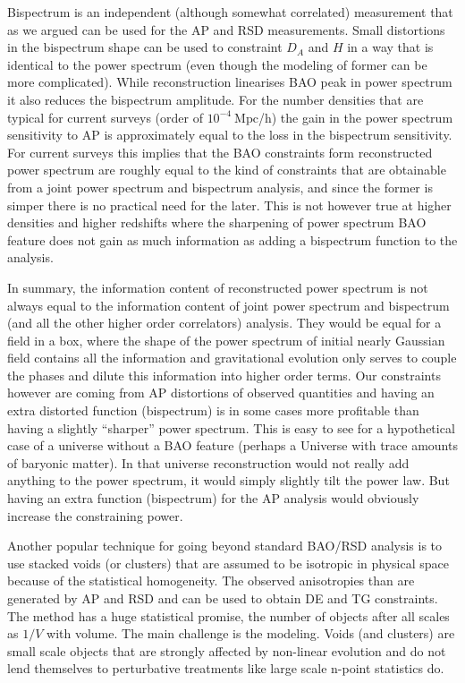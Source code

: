 Bispectrum is an independent (although somewhat correlated) measurement that as
we argued can be used for the AP and RSD measurements. Small distortions in the
bispectrum shape can be used to constraint $D_A$ and $H$ in a way that is
identical to the power spectrum (even though the modeling of former can be more
complicated). While reconstruction linearises BAO peak in power spectrum it
also reduces the bispectrum amplitude. For the number densities that are
typical for current surveys (order of $10^{-4}\ \mathrm{Mpc}$/h) the gain in
the power spectrum sensitivity to AP is approximately equal to the loss in the
bispectrum sensitivity. For current surveys this implies that the BAO
constraints form reconstructed power spectrum are roughly equal to the kind of
constraints that are obtainable from a joint power spectrum and bispectrum
analysis, and since the former is simper there is no practical need for the
later. This is not however true at higher densities and higher redshifts where
the sharpening of power spectrum BAO feature does not gain as much information
as adding a bispectrum function to the analysis. 

In summary, the information content of reconstructed power spectrum is not
always equal to the information content of joint power spectrum and bispectrum
(and all the other higher order correlators) analysis. They would be equal for
a field in a box, where the shape of the power spectrum of initial nearly
Gaussian field contains all the information and gravitational evolution only
serves to couple the phases and dilute this information into higher order
terms. Our constraints however are coming from AP distortions of observed
quantities and having an extra distorted function (bispectrum) is in some cases
more profitable than having a slightly ``sharper'' power spectrum. This is easy
to see for a hypothetical case of a universe without a BAO feature (perhaps a
Universe with trace amounts of baryonic matter). In that universe
reconstruction would not really add anything to the power spectrum, it would
simply slightly tilt the power law. But having an extra function (bispectrum)
for the AP analysis would obviously increase the constraining power.

Another popular technique for going beyond standard BAO/RSD analysis is to use
stacked voids (or clusters) that are assumed to be isotropic in physical space
because of the statistical homogeneity. The observed anisotropies than are
generated by AP and RSD and can be used to obtain DE and TG constraints. The
method has a huge statistical promise, the number of objects after all scales
as $1/V$ with volume. The main challenge is the modeling. Voids (and clusters)
are small scale objects that are strongly affected by non-linear evolution and
do not lend themselves to perturbative treatments like large scale n-point
statistics do.

